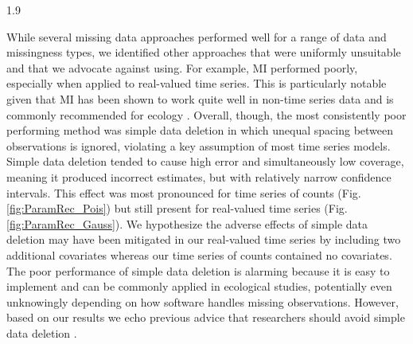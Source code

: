 \documentclass[12pt,english]{article} %
\begin{document}
\begin{linenumbers}
\begin{spacing}{1.9}
\begin{flushleft}
\hspace{1em} While several missing data approaches performed well for a range of data and missingness types, we identified other approaches that were uniformly unsuitable and that we advocate against using. For example, MI performed poorly, especially when applied to real-valued time series. This is particularly notable given that MI has been shown to work quite well in non-time series data \citep{graham_missing_2009} and is commonly recommended for ecology \citep{nakagawa_missing_2008,ellington_using_2015}. Overall, though, the most consistently poor performing method was simple data deletion in which unequal spacing between observations is ignored, violating a key assumption of most time series models. Simple data deletion tended to cause high error and simultaneously low coverage, meaning it produced incorrect estimates, but with relatively narrow confidence intervals. This effect was most pronounced for time series of counts (Fig. \ref{fig:ParamRec_Pois}) but still present for real-valued time series (Fig. \ref{fig:ParamRec_Gauss}). We hypothesize the adverse effects of simple data deletion may have been mitigated in our real-valued time series by including two additional covariates whereas our time series of counts contained no covariates. The poor performance of simple data deletion is alarming because it is easy to implement and can be commonly applied in ecological studies, potentially even unknowingly depending on how software handles missing observations. However, based on our results we echo previous advice that researchers should avoid simple data deletion \citep{nakagawa_model_2011, Shoari2018_mnar,lopucki2022handling}. 


\end{flushleft}
\end{spacing}
\end{linenumbers}
\end{document}
